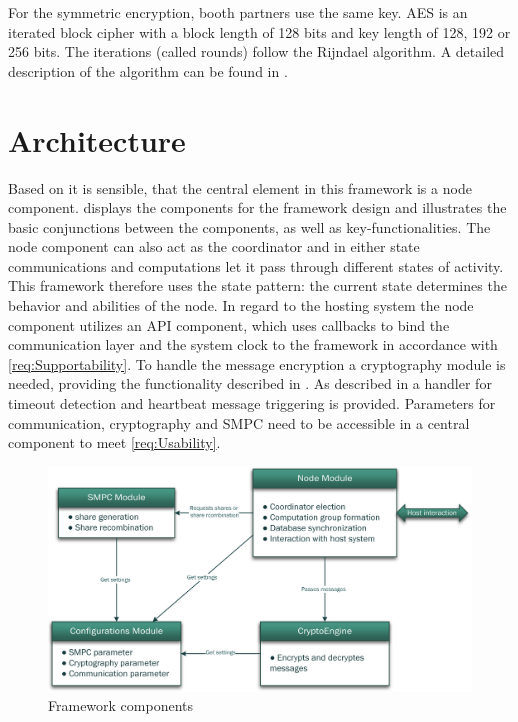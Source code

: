 For the symmetric encryption, booth partners use the same key. \gls{AES} is an iterated block cipher with a block length of 128 bits and key length of 128, 192 or 256 bits. The iterations (called rounds) follow the Rijndael algorithm. A detailed description of the algorithm can be found in \textcite[pp. 20-25]{Delfs2015}.

\section{Architecture} \label{Architecture}

Based on  it is sensible, that the central element in this framework is a node component.  displays the components for the framework design and illustrates the basic conjunctions between the components, as well as key-functionalities. The node component can also act as the coordinator and in either state communications and computations let it pass through different states of activity. This framework therefore uses the state pattern: the current state determines the behavior and abilities of the node.
In regard to the hosting system the node component utilizes an \gls{API} component, which uses callbacks to bind the communication layer and the system clock to the framework in accordance with \ref{req:Supportability}. To handle the message encryption a cryptography module is needed, providing the functionality described in . As described in  a handler for timeout detection and heartbeat message triggering is provided. Parameters for communication, cryptography and \gls{SMPC} need to be accessible in a central component to meet \ref{req:Usability}.

\begin{figure}[!htbp] %
	\caption{Framework components} \label{figure:UML component diagram}
	\includegraphics[scale=0.8]{figures/uml-component.png}
\end{figure}

